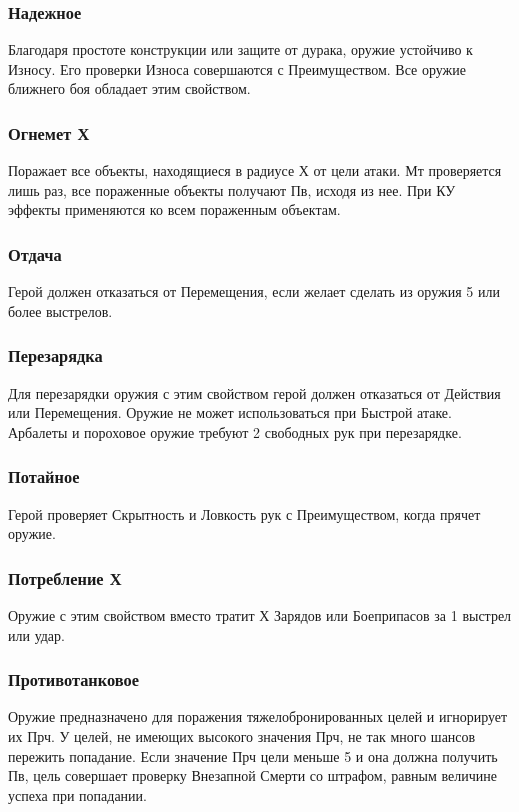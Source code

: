 \subsubsection{Надежное} Благодаря простоте конструкции или защите от дурака, оружие устойчиво к Износу. Его проверки Износа совершаются с Преимуществом. Все оружие ближнего боя обладает этим свойством.
\subsubsection{Огнемет Х} Поражает все объекты, находящиеся в радиусе Х от цели атаки. Мт проверяется лишь раз, все пораженные объекты получают Пв, исходя из нее. При КУ эффекты применяются ко всем пораженным объектам.
\subsubsection{Отдача} Герой должен отказаться от Перемещения, если желает сделать из оружия 5 или более выстрелов.
\subsubsection{Перезарядка} Для перезарядки оружия с этим свойством герой должен отказаться от Действия или Перемещения. Оружие не может использоваться при Быстрой атаке. Арбалеты и пороховое оружие требуют 2 свободных рук при перезарядке.
\subsubsection{Потайное} Герой проверяет Скрытность и Ловкость рук с Преимуществом, когда прячет оружие.
\subsubsection{Потребление Х} Оружие с этим свойством вместо тратит Х Зарядов или Боеприпасов за 1 выстрел или удар.
\subsubsection{Противотанковое} Оружие предназначено для поражения тяжелобронированных целей и игнорирует их Прч. У целей, не имеющих высокого значения Прч, не так много шансов пережить попадание. Если значение Прч цели меньше 5 и она должна получить Пв, цель совершает проверку Внезапной Смерти со штрафом, равным величине успеха при попадании.
